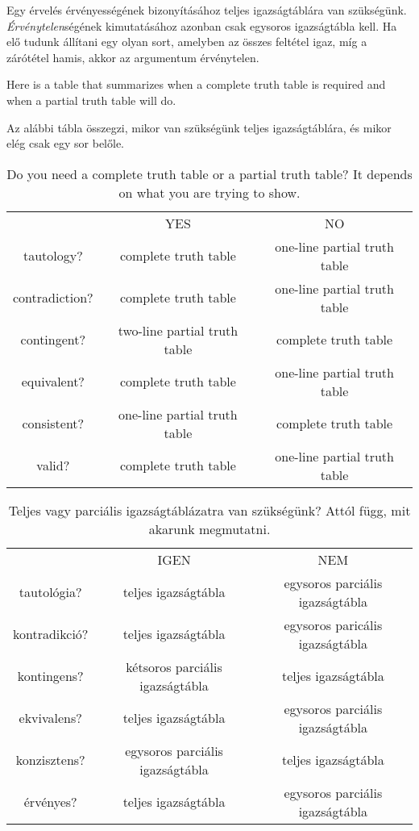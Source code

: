 Egy érvelés érvényességének bizonyításához teljes igazságtáblára van szükségünk. \emph{Érvénytelen}ségének kimutatásához azonban csak egysoros igazságtábla kell. Ha elő tudunk állítani egy olyan sort, amelyben az összes feltétel igaz, míg a zárótétel hamis, akkor az argumentum érvénytelen.

Here is a table that summarizes when a complete truth table is required and when a partial truth table will do.

Az alábbi tábla összegzi, mikor van szükségünk teljes igazságtáblára, és mikor elég csak egy sor belőle.

\begin{table}[h!]
\begin{center}
\begin{tabular}{c|c|c|}
\cline{2-3}
 & YES & NO\\
\cline{2-3}
tautology? & complete truth table & one-line partial truth table\\
contradiction? &  complete truth table  & one-line partial truth table\\
contingent? & two-line partial truth table & complete truth table\\
equivalent? & complete truth table & one-line partial truth table\\
consistent? & one-line partial truth table & complete truth table\\
valid? & complete truth table & one-line partial truth table\\
\cline{2-3}
\end{tabular}
\end{center}
\caption{Do you need a complete truth table or a partial truth table? It depends on what you are trying to show.}
\label{table.CompleteVsPartial}
\end{table}

\begin{table}[h!]
\begin{center}
\begin{tabular}{c|c|c|}
\cline{2-3}
 & IGEN & NEM\\
\cline{2-3}
tautológia? & teljes igazságtábla & egysoros parciális igazságtábla\\
kontradikció? &  teljes igazságtábla  & egysoros paricális igazságtábla\\
kontingens? & kétsoros parciális igazságtábla & teljes igazságtábla\\
ekvivalens? & teljes igazságtábla & egysoros parciális igazságtábla\\
konzisztens? & egysoros parciális igazságtábla & teljes igazságtábla\\
érvényes? & teljes igazságtábla & egysoros parciális igazságtábla\\
\cline{2-3}
\end{tabular}
\end{center}
\caption{Teljes vagy parciális igazságtáblázatra van szükségünk? Attól függ, mit akarunk
megmutatni.}
\label{table.CompleteVsPartial}
\end{table}

